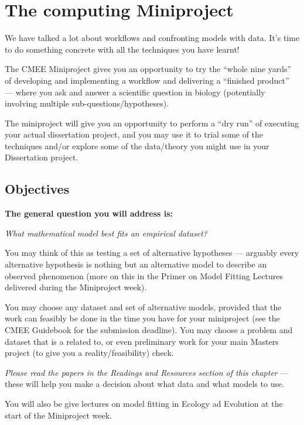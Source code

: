 \chapter{The computing Miniproject}
\label{chap:miniproj}

We have talked a lot about workflows and confronting models with data. 
It's time to do something concrete with all the techniques you have learnt!

The CMEE Miniproject gives you an opportunity to try the ``whole nine yards'' 
of developing and implementing a workflow and delivering a ``finished 
product'' --- where you ask and answer a scientific question in biology 
(potentially involving multiple sub-questions/hypotheses). 

The miniproject will give you an opportunity to perform a ``dry run'' 
of executing your actual dissertation project, and you may use it to 
trial some of the techniques and/or explore some of the data/theory  
you might use in your Dissertation project.

\section {Objectives}

{\bf The general question you will address is:} 

\begin{center}
	
\it What mathematical model best fits an empirical dataset?

\end{center}

You may think of this as testing a set of alternative hypotheses --- 
arguably every alternative hypothesis is nothing but an alternative model to 
describe an observed phenomenon (more on this in the Primer on Model 
Fitting Lectures delivered during the Miniproject week). 
 
You may choose any dataset and set of alternative models, provided that 
the work can feasibly be done in the time you have for your miniproject 
(see the CMEE Guidebook for the submission deadline). You may choose a 
problem and dataset that is a related to, or even preliminary work for 
your main Masters project (to give you a reality/feasibility) check.  

{\it Please read the papers in the Readings and Resources section of 
this chapter} --- these will help you make a decision about what data 
and what models to use.

You will also be give lectures on model fitting in Ecology ad Evolution 
at the start of the Miniproject week.  

